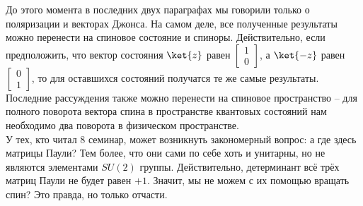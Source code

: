 До этого момента в последних двух параграфах мы говорили только о поляризации и векторах Джонса. На самом деле, все полученные результаты можно перенести на спиновое состояние и спиноры. Действительно, если предположить, что вектор состояния $\ket{z}$ равен $\begin{bmatrix} 1 \\ 0 \end{bmatrix}$, а $\ket{-z}$ равен $\begin{bmatrix} 0 \\ 1 \end{bmatrix}$, то для оставшихся состояний получатся те же самые результаты. Последние рассуждения также можно перенести на спиновое пространство -- для полного поворота вектора спина в пространстве квантовых состояний нам необходимо два поворота в физическом пространстве.\\
У тех, кто читал 8 семинар, может возникнуть закономерный вопрос: а где здесь матрицы Паули? Тем более, что они сами по себе хоть и унитарны, но не являются элементами $SU(2)$ группы. Действительно, детерминант всё трёх матриц Паули не будет равен $+1$. Значит, мы не можем с их помощью вращать спин? Это правда, но только отчасти.
